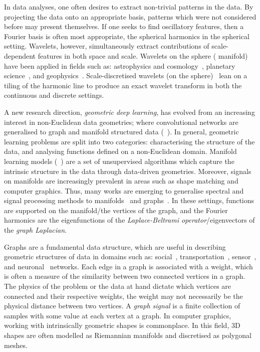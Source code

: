 In data analyses, one often desires to extract non-trivial patterns in the data.
By projecting the data onto an appropriate basis, patterns which were not considered before may present themselves.
If one seeks to find oscillatory features, then a Fourier basis is often most appropriate, \ie{} the spherical harmonics in the spherical setting.
Wavelets, however, simultaneously extract contributions of scale-dependent features in both space and scale.
Wavelets on the sphere (\cf{} manifold) have been applied in fields such as: astrophysics and cosmology~\cite{Pen1999,Barreiro2001,Rocha2004,McEwen2004}, planetary science~\cite{Audet2011,Audet2014}, and geophysics~\cite{Loris2010,Simons2011,Simons2011b}.
Scale-discretised wavelets (on the sphere)~\cite{Wiaux2008,McEwen2018,Leistedt2013,McEwen2013,McEwen2015} lean on a tiling of the harmonic line to produce an exact wavelet transform in both the continuous and discrete settings.

A new research direction, \emph{geometric deep learning}, has evolved from an increasing interest in non-Euclidean data geometries; where convolutional networks are generalised to graph and manifold structured data (\eg{}~\cite{Bronstein2017,Perlmutter2020}).
In general, geometric learning problems are split into two categories: characterising the structure of the data, and analysing functions defined on a non-Euclidean domain.
Manifold learning models (\eg{}~\cite{Tenenbaum2000,Coifman2006b,VanDerMaaten2008}) are a set of unsupervised algorithms which capture the intrinsic structure in the data through data-driven geometries.
Moreover, signals on manifolds are increasingly prevalent in areas such as shape matching and computer graphics.
Thus, many works are emerging to generalise spectral and signal processing methods to manifolds~\cite{Coifman2006} and graphs~\cite{Shuman2013}.
In these settings, functions are supported on the manifold/the vertices of the graph, and the Fourier harmonics are the eigenfunctions of the \emph{Laplace-Beltrami operator}/eigenvectors of the \emph{graph Laplacian}.

Graphs are a fundamental data structure, which are useful in describing geometric structures of data in domains such as: social~\cite{Nettleton2013}, transportation~\cite{Mohan2014}, sensor~\cite{Kenniche2010}, and neuronal~\cite{Tang2012} networks.
Each edge in a graph is associated with a weight, which is often a measure of the similarity between two connected vertices in a graph.
The physics of the problem or the data at hand dictate which vertices are connected and their respective weights, \ie{} the weight may not necessarily be the physical distance between two vertices.
A \emph{graph signal} is a finite collection of samples with some value at each vertex at a graph.
In computer graphics, working with intrinsically geometric shapes is commonplace.
In this field, 3D shapes are often modelled as Riemannian manifolds and discretised as polygonal meshes.

